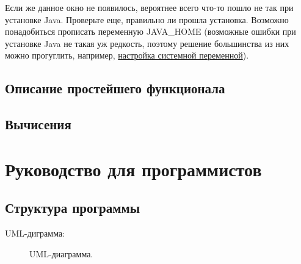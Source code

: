 \documentclass{article}
\numberwithin{equation}{section}
\begin{document}
Если же данное окно не появилось, вероятнее всего что-то пошло не так при установке Java. Проверьте еще, правильно ли прошла установка. Возможно понадобиться прописать переменную JAVA\_HOME (возможные ошибки при установке Java не такая уж редкость, поэтому решение большинства из них можно прогуглить, например, \href{https://www.java.com/ru/download/help/path.xml}{настройка системной переменной}).

\subsection{Описание простейшего функционала}


\subsection{Вычисения}


\newpage

\section{Руководство для программистов}

\subsection{Структура программы}
UML-диграмма:

\begin{figure}[h]
\caption{UML-диаграмма.}
\label{ris:image}
\end{figure}
\end{document}

